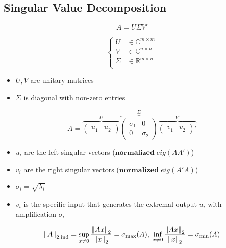 \subsection{Singular Value Decomposition}   
\begin{minipage}{0.2\linewidth}
    \begin{equation*}
        A = U\Sigma V'
    \end{equation*} 
\end{minipage}
\begin{minipage}{0.3\linewidth}
    \begin{equation*}
        \left\{
            \begin{aligned}
                U &\in \mathbb{C}^{m \times m}\\
                V &\in \mathbb{C}^{n \times n}\\
                \Sigma &\in \mathbb{R}^{m \times n}\\
            \end{aligned}
        \right.
    \end{equation*}
\end{minipage}
\begin{minipage}{0.49\linewidth}
    \begin{itemize}
        \item $U,V$ are unitary matrices
        \item $\Sigma$ is diagonal with non-zero entries
    \end{itemize}
\end{minipage}
$$
A = \overbrace{\begin{pmatrix} \underline{u}_1 & \underline{u}_2 \end{pmatrix}}^U
\overbrace{\begin{pmatrix}
    \sigma_1 & 0 \\
    0 & \sigma_2
\end{pmatrix}}^\Sigma
\overbrace{\begin{pmatrix} \underline{v}_1 & \underline{v}_2 \end{pmatrix}'}^{V'}
$$
\begin{itemize}
    \item $u_i$ are the left singular vectors ($\textbf{normalized} \; eig(AA')$)
    \item $v_i$ are the right singular vectors ($\textbf{normalized} \; eig(A'A)$)
    \item $\sigma_i = \sqrt{\lambda_i}$ 
    \item $v_i$ is the specific input that generates the extremal output $u_i$ with amplification $\sigma_i$
\end{itemize}
$$
    \left\| A \right\|_{2,\text{ind}} = \sup_{x \neq 0} \frac{\left\| Ax \right\|_2}{\left\| x \right\|_2} = \sigma_{\textrm{max}}(A)
    , \; \inf_{x \neq 0} \frac{\left\| Ax \right\|_2}{\left\| x \right\|_2} = \sigma_{\textrm{min}}(A)
$$